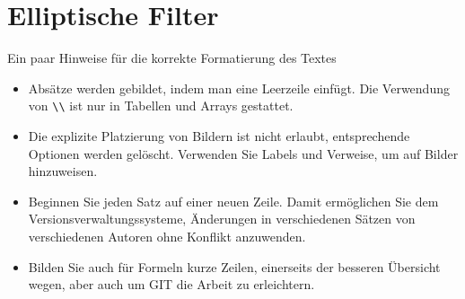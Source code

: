 %
%
%
\chapter{Elliptische Filter\label{chapter:ellfilter}}
\begin{refsection}

Ein paar Hinweise für die korrekte Formatierung des Textes
\begin{itemize}
\item
Absätze werden gebildet, indem man eine Leerzeile einfügt.
Die Verwendung von \verb+\\+ ist nur in Tabellen und Arrays gestattet.
\item
Die explizite Platzierung von Bildern ist nicht erlaubt, entsprechende
Optionen werden gelöscht.
Verwenden Sie Labels und Verweise, um auf Bilder hinzuweisen.
\item
Beginnen Sie jeden Satz auf einer neuen Zeile.
Damit ermöglichen Sie dem Versionsverwaltungssysteme, Änderungen
in verschiedenen Sätzen von verschiedenen Autoren ohne Konflikt
anzuwenden.
\item
Bilden Sie auch für Formeln kurze Zeilen, einerseits der besseren
Übersicht wegen, aber auch um GIT die Arbeit zu erleichtern.
\end{itemize}






\printbibliography[heading=subbibliography]
\end{refsection}
